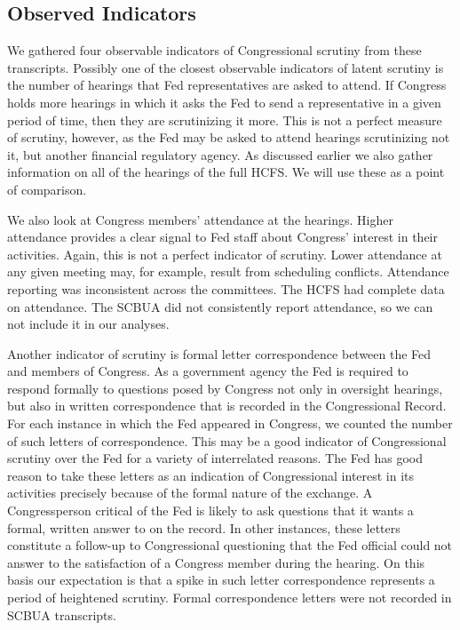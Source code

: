 \documentclass[a4paper]{article}\usepackage[]{graphicx}\usepackage[]{color}
\begin{document}
\subsection{Observed Indicators}

We gathered four observable indicators of Congressional scrutiny from these transcripts. Possibly one of the closest observable indicators of latent scrutiny is the number of hearings that Fed representatives are asked to attend. If Congress holds more hearings in which it asks the Fed to send a representative in a given period of time, then they are scrutinizing it more. This is not a perfect measure of scrutiny, however, as the Fed may be asked to attend hearings scrutinizing not it, but another financial regulatory agency. As discussed earlier we also gather information on all of the hearings of the full HCFS. We will use these as a point of comparison.

We also look at Congress members' attendance at the hearings. Higher attendance provides a clear signal to Fed staff about Congress' interest in their activities. Again, this is not a perfect indicator of scrutiny. Lower attendance at any given meeting may, for example, result from scheduling conflicts. Attendance reporting was inconsistent across the committees. The HCFS had complete data on attendance. The SCBUA did not consistently report attendance, so we can not include it in our analyses.

Another indicator of scrutiny is formal letter correspondence between the Fed and members of Congress. As a government agency the Fed is required to respond formally to questions posed by Congress not only in oversight hearings, but also in written correspondence that is recorded  in the Congressional Record. For each instance in which the Fed appeared in Congress, we counted the number of such letters of correspondence. This may be a good indicator of Congressional scrutiny over the Fed for a variety of interrelated reasons. The Fed has good reason to take these letters as an indication of Congressional interest in its activities precisely because of the formal nature of the exchange. A Congressperson critical of the Fed is likely to ask questions that it wants a formal, written answer to on the record. In other instances, these letters constitute a follow-up to Congressional questioning that the Fed official could not answer to the satisfaction of a Congress member during the hearing. On this basis our expectation is that a spike in such letter correspondence represents a period of heightened scrutiny. Formal correspondence letters were not recorded in SCBUA transcripts.
\end{document}
